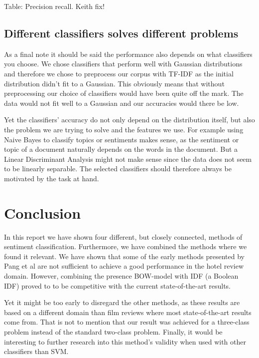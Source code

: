 \documentclass{article}
\begin{document}
Table: Precision recall. Keith fix!


\subsection{Different classifiers solves different problems}
As a final note it should be said the performance also depends on what classifiers you choose. We chose classifiers that perform well with Gaussian distributions and therefore we chose to preprocess our corpus with TF-IDF as the initial distribution didn’t fit to a Gaussian. This obviously means that without preprocessing our choice of classifiers would have been quite off the mark. The data would not fit well to a Gaussian and our accuracies would there be low. 

Yet the classifiers’ accuracy do not only depend on the distribution itself, but also the problem we are trying to solve and the features we use.  For example using Naive Bayes to classify topics or sentiments makes sense, as the sentiment or topic of a document naturally depends on the words in the document. But a Linear Discriminant Analysis might not make sense since the data does not seem to be linearly separable. The selected classifiers should therefore always be motivated by the task at hand. 


\section{Conclusion}
In this report we have shown four different, but closely connected, methods of sentiment classification. Furthermore, we have combined the methods where we found it relevant. We have shown that some of the early methods presented by Pang et al are not sufficient to achieve a good performance in the hotel review domain. However, combining the presence BOW-model with IDF (a Boolean IDF) proved to to be competitive with the current state-of-the-art results. 

Yet it might be too early to disregard the other methods, as these results are based on a different domain than film reviews where most state-of-the-art results come from. That is not to mention that our result was achieved for a three-class problem instead of the standard two-class problem.
Finally, it would be interesting to further research into this method’s validity when used with other classifiers than SVM. 
\end{document}
